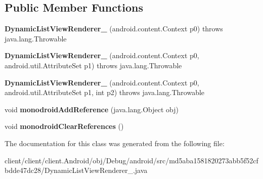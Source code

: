 \subsection*{Public Member Functions}
\begin{DoxyCompactItemize}
\item 
\hypertarget{classmd5aba1581820273abb5f52cfbdde47dc28_1_1DynamicListViewRenderer__1_af5d09373dac191d67393bae3c97c61fd}{}{\bfseries Dynamic\+List\+View\+Renderer\+\_} (android.\+content.\+Context p0)  throws java.\+lang.\+Throwable 	\label{classmd5aba1581820273abb5f52cfbdde47dc28_1_1DynamicListViewRenderer__1_af5d09373dac191d67393bae3c97c61fd}

\item 
\hypertarget{classmd5aba1581820273abb5f52cfbdde47dc28_1_1DynamicListViewRenderer__1_a6d617c4768c0ffa6486d61945fcb1b22}{}{\bfseries Dynamic\+List\+View\+Renderer\+\_} (android.\+content.\+Context p0, android.\+util.\+Attribute\+Set p1)  throws java.\+lang.\+Throwable 	\label{classmd5aba1581820273abb5f52cfbdde47dc28_1_1DynamicListViewRenderer__1_a6d617c4768c0ffa6486d61945fcb1b22}

\item 
\hypertarget{classmd5aba1581820273abb5f52cfbdde47dc28_1_1DynamicListViewRenderer__1_a2d6809290180d7e01f18dc0c8ca79894}{}{\bfseries Dynamic\+List\+View\+Renderer\+\_} (android.\+content.\+Context p0, android.\+util.\+Attribute\+Set p1, int p2)  throws java.\+lang.\+Throwable 	\label{classmd5aba1581820273abb5f52cfbdde47dc28_1_1DynamicListViewRenderer__1_a2d6809290180d7e01f18dc0c8ca79894}

\item 
\hypertarget{classmd5aba1581820273abb5f52cfbdde47dc28_1_1DynamicListViewRenderer__1_a936dbc07f9714513b8e9573251edc5bc}{}void {\bfseries monodroid\+Add\+Reference} (java.\+lang.\+Object obj)\label{classmd5aba1581820273abb5f52cfbdde47dc28_1_1DynamicListViewRenderer__1_a936dbc07f9714513b8e9573251edc5bc}

\item 
\hypertarget{classmd5aba1581820273abb5f52cfbdde47dc28_1_1DynamicListViewRenderer__1_ac78bb75a4b6624deb14ff0f7dc869775}{}void {\bfseries monodroid\+Clear\+References} ()\label{classmd5aba1581820273abb5f52cfbdde47dc28_1_1DynamicListViewRenderer__1_ac78bb75a4b6624deb14ff0f7dc869775}

\end{DoxyCompactItemize}


The documentation for this class was generated from the following file\+:\begin{DoxyCompactItemize}
\item 
client/client/client.\+Android/obj/\+Debug/android/src/md5aba1581820273abb5f52cfbdde47dc28/Dynamic\+List\+View\+Renderer\+\_.\+java\end{DoxyCompactItemize}
